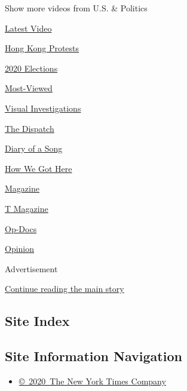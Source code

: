 Show more videos from U.S. \& Politics

\href{/video}{}

\href{/video/latest-video}{Latest Video}

\href{/video/hk-protest}{Hong Kong Protests}

\href{/video/2020-Elections}{2020 Elections}

\href{/video/Most-Viewed}{Most-Viewed}

\href{/video/investigations}{Visual Investigations}

\href{/video/on-the-ground}{The Dispatch}

\href{/video/diaryofasong}{Diary of a Song}

\href{/video/how-we-got-here}{How We Got Here}

\href{/video/magazine}{Magazine}

\href{/video/t-magazine}{T Magazine}

\href{/video/op-docs}{Op-Docs}

\href{/video/opinion}{Opinion}

Advertisement

\protect\hyperlink{after-bottom}{Continue reading the main story}

\hypertarget{site-index}{%
\subsection{Site Index}\label{site-index}}

\hypertarget{site-information-navigation}{%
\subsection{Site Information
Navigation}\label{site-information-navigation}}

\begin{itemize}
\tightlist
\item
  \href{https://help.nytimes3xbfgragh.onion/hc/en-us/articles/115014792127-Copyright-notice}{©~2020~The
  New York Times Company}
\end{itemize}

